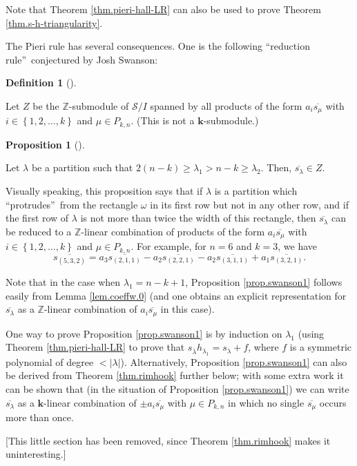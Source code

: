 \documentclass[numbers=enddot,12pt,final,onecolumn,notitlepage]{scrartcl}%
\theoremstyle{definition}
\newtheorem{prop}[theo]{Proposition}
\newenvironment{proposition}[1][]
{\begin{prop}[#1]\begin{leftbar}}
{\end{leftbar}\end{prop}}
\newtheorem{defi}[theo]{Definition}
\newenvironment{definition}[1][]
{\begin{defi}[#1]\begin{leftbar}}
{\end{leftbar}\end{defi}}
\newenvironment{verlong}{}{}
\begin{document}
Note that Theorem \ref{thm.pieri-hall-LR} can also be used to prove Theorem
\ref{thm.s-h-triangularity}.



\begin{verlong}
The Pieri rule has several consequences. One is the following
\textquotedblleft reduction rule\textquotedblright\ conjectured by Josh Swanson:

\begin{definition}
Let $Z$ be the $\mathbb{Z}$-submodule of $\mathcal{S}/I$ spanned by all
products of the form $a_{i}\overline{s_{\mu}}$ with $i\in\left\{
1,2,\ldots,k\right\}  $ and $\mu\in P_{k,n}$. (This is not a $\mathbf{k}$-submodule.)
\end{definition}

\begin{proposition}
\label{prop.swanson1}Let $\lambda$ be a partition such that $2\left(
n-k\right)  \geq\lambda_{1}>n-k\geq\lambda_{2}$. Then, $\overline{s_{\lambda}%
}\in Z$.
\end{proposition}

Visually speaking, this proposition says that if $\lambda$ is a partition
which \textquotedblleft protrudes\textquotedblright\ from the rectangle
$\omega$ in its first row but not in any other row, and if the first row of
$\lambda$ is not more than twice the width of this rectangle, then
$\overline{s_{\lambda}}$ can be reduced to a $\mathbb{Z}$-linear combination
of products of the form $a_{i}\overline{s_{\mu}}$ with $i\in\left\{
1,2,\ldots,k\right\}  $ and $\mu\in P_{k,n}$. For example, for $n=6$ and
$k=3$, we have%
\[
\overline{s_{\left(  5,3,2\right)  }}=a_{3}\overline{s_{\left(  2,1,1\right)
}}-a_{2}\overline{s_{\left(  2,2,1\right)  }}-a_{2}\overline{s_{\left(
3,1,1\right)  }}+a_{1}\overline{s_{\left(  3,2,1\right)  }}.
\]


Note that in the case when $\lambda_{1}=n-k+1$, Proposition
\ref{prop.swanson1} follows easily from Lemma \ref{lem.coeffw.0} (and one
obtains an explicit representation for $\overline{s_{\lambda}}$ as a
$\mathbb{Z}$-linear combination of $a_{i}\overline{s_{\mu}}$ in this case).

One way to prove Proposition \ref{prop.swanson1} is by induction on
$\lambda_{1}$ (using Theorem \ref{thm.pieri-hall-LR} to prove that
$s_{\overline{\lambda}}h_{\lambda_{1}}=s_{\lambda}+f$, where $f$ is a
symmetric polynomial of degree $<\left\vert \lambda\right\vert $).
Alternatively, Proposition \ref{prop.swanson1} can also be derived from
Theorem \ref{thm.rimhook} further below; with some extra work it can be shown
that (in the situation of Proposition \ref{prop.swanson1}) we can write
$\overline{s_{\lambda}}$ as a $\mathbf{k}$-linear combination of $\pm
a_{i}\overline{s_{\mu}}$ with $\mu\in P_{k,n}$ in which no single
$\overline{s_{\mu}}$ occurs more than once.

[This little section has been removed, since Theorem \ref{thm.rimhook} makes
it uninteresting.]
\end{verlong}
\end{document}
